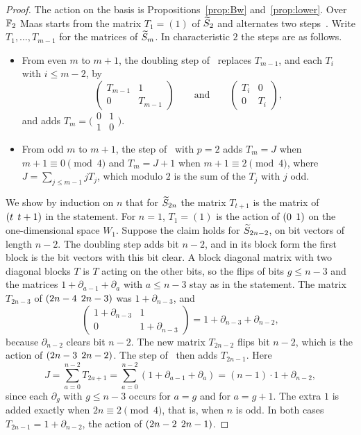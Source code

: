 \begin{proof}
The action on the basis is Propositions~\ref{prop:Bw} and~\ref{prop:lower}. Over $\mathbb{F}_2$ Maas starts from the matrix $T_1=(1)$ of $\widetilde{S}_2$ and alternates two steps~\cite[Table~1]{Maas10}. Write $T_1,\dots,T_{m-1}$ for the matrices of $\widetilde{S}_m$. In characteristic $2$ the steps are as follows.
\begin{itemize}
\item From even $m$ to $m+1$, the doubling step of~\cite[Lemma~5]{Maas10} replaces $T_{m-1}$, and each $T_i$ with $i\le m-2$, by
\[
\begin{pmatrix}T_{m-1}&1\\0&T_{m-1}\end{pmatrix}\qquad\text{and}\qquad\begin{pmatrix}T_i&0\\0&T_i\end{pmatrix},
\]
and adds $T_m=\bigl(\begin{smallmatrix}0&1\\1&0\end{smallmatrix}\bigr)$.
\item From odd $m$ to $m+1$, the step of~\cite[Lemma~7]{Maas10} with $p=2$ adds $T_m=J$ when $m+1\equiv0\pmod4$ and $T_m=J+1$ when $m+1\equiv2\pmod4$, where $J=\sum_{j\le m-1}jT_j$, which modulo $2$ is the sum of the $T_j$ with $j$ odd.
\end{itemize}
We show by induction on $n$ that for $\widetilde{S}_{2n}$ the matrix $T_{t+1}$ is the matrix of $(t\;\,t+1)$ in the statement. For $n=1$, $T_1=(1)$ is the action of $(0\;\,1)$ on the one-dimensional space $W_1$. Suppose the claim holds for $\widetilde{S}_{2n-2}$, on bit vectors of length $n-2$. The doubling step adds bit $n-2$, and in its block form the first block is the bit vectors with this bit clear. A block diagonal matrix with two diagonal blocks $T$ is $T$ acting on the other bits, so the flips of bits $g\le n-3$ and the matrices $1+\partial_{a-1}+\partial_a$ with $a\le n-3$ stay as in the statement. The matrix $T_{2n-3}$ of $(2n-4\;\,2n-3)$ was $1+\partial_{n-3}$, and
\[
\begin{pmatrix}1+\partial_{n-3}&1\\0&1+\partial_{n-3}\end{pmatrix}=1+\partial_{n-3}+\partial_{n-2},
\]
because $\partial_{n-2}$ clears bit $n-2$. The new matrix $T_{2n-2}$ flips bit $n-2$, which is the action of $(2n-3\;\,2n-2)$. The step of~\cite[Lemma~7]{Maas10} then adds $T_{2n-1}$. Here
\[
J=\sum_{a=0}^{n-2}T_{2a+1}=\sum_{a=0}^{n-2}(1+\partial_{a-1}+\partial_a)=(n-1)\cdot1+\partial_{n-2},
\]
since each $\partial_g$ with $g\le n-3$ occurs for $a=g$ and for $a=g+1$. The extra $1$ is added exactly when $2n\equiv2\pmod4$, that is, when $n$ is odd. In both cases $T_{2n-1}=1+\partial_{n-2}$, the action of $(2n-2\;\,2n-1)$.
\end{proof}

